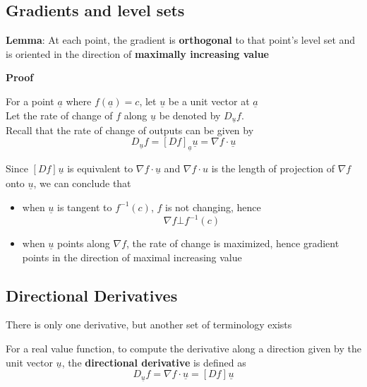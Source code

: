 \subsection{Gradients and level sets}

\begin{framed}
   \textbf{Lemma}: At each point, the gradient is \textbf{orthogonal} to that point's level set and is oriented in the direction of \textbf{maximally increasing value}
\end{framed}

\textbf{Proof}

For a point $ \underline{a}$ where $ f( \underline{a}) = c$, let $ \underline{u}$ be a unit vector at $ \underline{a}$ \\

Let the rate of change of $ f$ along $ \underline{u}$ be denoted by $ D_{ \underline{u}}f$. \\

Recall that the rate of change of outputs can be given by \[
   D_{ \underline{u}}f = \left[ D f \right]_{ \underline{a}}  \underline{u}  = \nabla f \cdot \underline{u}
\] 

Since $ \left[ D f \right]_{} \underline{u}  $ is equivalent to $ \nabla f \cdot \underline{u}$  and $ \nabla f \cdot u$ is the length of projection of $ \nabla f$ onto $ \underline{u}$, we can conclude that 

\begin{itemize}
   \item when $ \underline{u}$ is tangent to $ f^{-1}(c)$, $f$ is not changing, hence \[
         \nabla f \bot f^{-1} (c)
   \] 
   \item when $ \underline{ u}$ points along $\nabla f$, the rate of change is maximized, hence gradient points in the direction of maximal increasing value
\end{itemize}

\subsection{Directional Derivatives}

There is only one derivative, but another set of terminology exists

\begin{framed}
   For a real value function, to compute the derivative along a direction given by the unit vector $\underline{u}$, the \textbf{directional derivative} is defined as \[
      D_{ \underline{u}}f = \nabla f \cdot \underline{u} = \left[ D f \right]_{} \underline{u}
   \]  
\end{framed}


